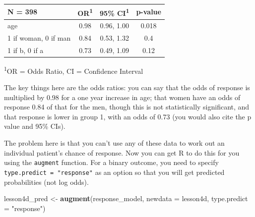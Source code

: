 \documentclass[]{book}
\newenvironment{Shaded}{\begin{snugshade}}{\end{snugshade}}
\newcommand{\DataTypeTok}[1]{\textcolor[rgb]{0.13,0.29,0.53}{#1}}
\newcommand{\KeywordTok}[1]{\textcolor[rgb]{0.13,0.29,0.53}{\textbf{#1}}}
\newcommand{\NormalTok}[1]{#1}
\newcommand{\OperatorTok}[1]{\textcolor[rgb]{0.81,0.36,0.00}{\textbf{#1}}}
\newcommand{\OtherTok}[1]{\textcolor[rgb]{0.56,0.35,0.01}{#1}}
\newcommand{\StringTok}[1]{\textcolor[rgb]{0.31,0.60,0.02}{#1}}
\begin{document}
\begin{Shaded}
\end{Shaded}

\captionsetup[table]{labelformat=empty,skip=1pt}
\begin{longtable}{lccc}
\toprule
\textbf{N = 398} & \textbf{OR}\textsuperscript{1} & \textbf{95\% CI}\textsuperscript{1} & \textbf{p-value} \\ 
\midrule
age & 0.98 & 0.96, 1.00 & 0.018 \\ 
1 if woman, 0 if man & 0.84 & 0.53, 1.32 & 0.4 \\ 
1 if b, 0 if a & 0.73 & 0.49, 1.09 & 0.12 \\ 
\bottomrule
\end{longtable}
\vspace{-5mm}
\begin{minipage}{\linewidth}
\textsuperscript{1}OR = Odds Ratio, CI = Confidence Interval \\ 
\end{minipage}

The key things here are the odds ratios: you can say that the odds of response is multiplied by 0.98 for a one year increase in age; that women have an odds of response 0.84 of that for the men, though this is not statistically significant, and that response is lower in group 1, with an odds of 0.73 (you would also cite the p value and 95\% CIs).

The problem here is that you can't use any of these data to work out an individual patient's chance of response. Now you can get R to do this for you using the \texttt{augment} function. For a binary outcome, you need to specify \texttt{type.predict\ =\ "response"} as an option so that you will get predicted probabilities (not log odds).

\begin{Shaded}
\begin{Highlighting}[]
\NormalTok{lesson4d_pred <-}
\StringTok{  }\KeywordTok{augment}\NormalTok{(response_model,}
          \DataTypeTok{newdata =}\NormalTok{ lesson4d,}
          \DataTypeTok{type.predict =} \StringTok{"response"}\NormalTok{)}
\end{Highlighting}
\end{Shaded}
\end{document}
